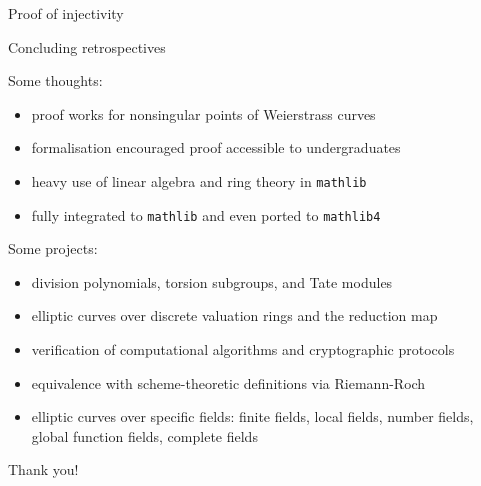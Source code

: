 \documentclass[10pt]{beamer}
\begin{document}
\begin{frame}[t]{Proof of injectivity}

\end{frame}

\begin{frame}[t]{Concluding retrospectives}

Some thoughts:
\begin{itemize}
\item proof works for nonsingular points of Weierstrass curves
\item formalisation encouraged proof accessible to undergraduates
\item heavy use of linear algebra and ring theory in \texttt{mathlib}
\item fully integrated to \texttt{mathlib} and even ported to \texttt{mathlib4}
\end{itemize}

\pause \vspace{0.5cm}

Some projects:
\begin{itemize}
\item division polynomials, torsion subgroups, and Tate modules
\item elliptic curves over discrete valuation rings and the reduction map
\item verification of computational algorithms and cryptographic protocols
\item equivalence with scheme-theoretic definitions via Riemann-Roch
\item elliptic curves over specific fields: finite fields, local fields, number fields, global function fields, complete fields
\end{itemize}

\pause \vspace{0.5cm}

Thank you!

\end{frame}
\end{document}
